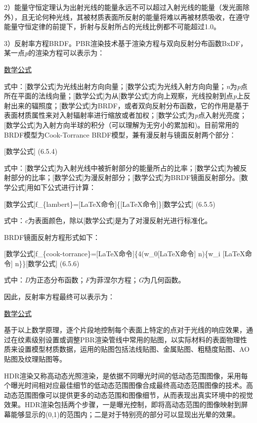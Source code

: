 2）能量守恒定理认为出射光线的能量永远不可以超过入射光线的能量（发光面除外），且无论何种光线，其被材质表面所反射的能量将难以再被材质吸收，在遵守能量守恒定律的前提下，折射与反射所占的光线比例都不可能超过1.0。

3）反射率方程BRDF。PBR渲染技术基于渲染方程与双向反射分布函数BxDF，某一点\emph{p}的渲染方程可以表示为：

\href{6.5.3}{数学公式}

式中：{[}数学公式{]}为光线出射方向向量；{[}数学公式{]}为光线入射方向向量；\emph{n}为\emph{p}点所在平面的法线向量；{[}数学公式{]}为从{[}数学公式{]}方向上观察，光线投射到点\emph{p}上反射出来的辐照度；{[}数学公式{]}为BRDF，或者双向反射分布函数，它的作用是基于表面材质属性来对入射辐射率进行缩放或者加权；{[}数学公式{]}为\emph{p}点入射光亮度；{[}数学公式{]}为入射方向半球的积分（可以理解为无穷小的累加和)。目前常用的BRDF模型为Cook-Torrance BRDF模型，兼有漫反射与镜面反射两个部分：

{[}数学公式{]} (6.5.4)

式中：{[}数学公式{]}为入射光线中被折射部分的能量所占的比率；{[}数学公式{]}为被反射部分的比率；{[}数学公式{]}为漫反射部分；{[}数学公式{]}为BRDF镜面反射部分。{[}数学公式{]}用如下公式进行计算：

{[}数学公式{]}f\_\{lambert\}={[}LaTeX命令{]}\{{[}LaTeX命令{]}\}{[}数学公式{]} (6.5.5)

式中：\emph{c}为表面颜色，除以{[}数学公式{]}是为了对漫反射光进行标准化。

BRDF镜面反射方程形式如下：

{[}数学公式{]}f\_\{cook-torrance\}={[}LaTeX命令{]}\{4(w\_0{[}LaTeX命令{]} n)\{w\_i {[}LaTeX命令{]} n\}\}{[}数学公式{]} (6.5.6)

式中：\emph{D}为正态分布函数；\emph{F}为菲涅尔方程；\emph{G}为几何函数。

因此，反射率方程最终可以表示为：

\href{6.5.7}{数学公式}

基于以上数学原理，逐个片段地控制每个表面上特定的点对于光线的响应效果，通过在纹素级别设置或调整PBR渲染管线中常用的贴图，以实际材料的表面物理性质来设置模型材质数据，运用的贴图包括法线贴图、金属贴图、粗糙度贴图、AO贴图及纹理贴图等。

HDR渲染又称高动态光照渲染，是依据不同曝光时间的低动态范围图像，采用每个曝光时间相对应最佳细节的低动态范围图像合成最终高动态范围图像的技术。高动态范围图像可以提供更多的动态范围和图像细节，从而表现出真实环境中的视觉效果。HDR渲染包括两个步骤，一是曝光控制，即将高动态范围的图像映射到屏幕能够显示的(0,1)的范围内；二是对于特别亮的部分可以显现出光晕的效果。

